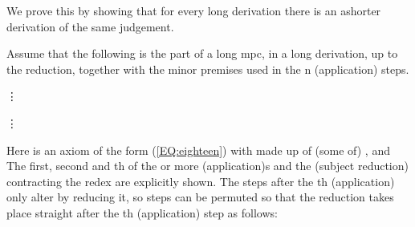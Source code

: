 \documentclass{LMCS}
\begin{document}
\begin{thm}
{\proof We prove this by showing that for every long
  derivation there is an ashorter derivation of the same judgement.

  Assume that the following is the part of a long mpc, in a long
  derivation, up to the  reduction, together with the
  minor premises used in the n (application) steps.


{\small
\vspace{-3mm}


\vspace{-2mm}\hspace{3cm}\hbox{\vrule height .4pt width 10cm}

\hspace {6.2cm}\vdots

\vspace{-2mm}\hspace{3cm}\hbox{\vrule height .4pt width 10cm}

\hspace {6.2cm}\vdots

\vspace{-2mm}\hspace{3cm}\hbox{\vrule height .4pt width 10cm}

\vspace{-2mm}\hspace{3cm}


\vspace{-2mm}\hspace{3cm}\hbox{\vrule height .4pt width 10cm}

}

 \noindent Here  is an axiom of
  the form (\ref{EQ:eighteen}) with  made up of (some of)
  ,  and  The
  first, second and th of the  or more (application)s and the
  (subject reduction) contracting the  redex are
  explicitly shown. The steps after the th (application) only alter
   by reducing it, so steps can be permuted so that the  reduction takes place straight after the th (application)
  step as follows:
\medskip

{\small
\hspace {3.6cm}

\vspace{2mm}\hspace{3.6cm}\hbox{\vrule height .4pt width 5.2cm}\vspace{-2mm}

\vspace{-2mm}\hspace{3cm}\hbox{\vrule height .4pt width 10cm}

\vspace{-2mm}\hspace{4cm}\hbox{\vrule height .4pt width 9cm}

}}
\end{thm}
\end{document}
